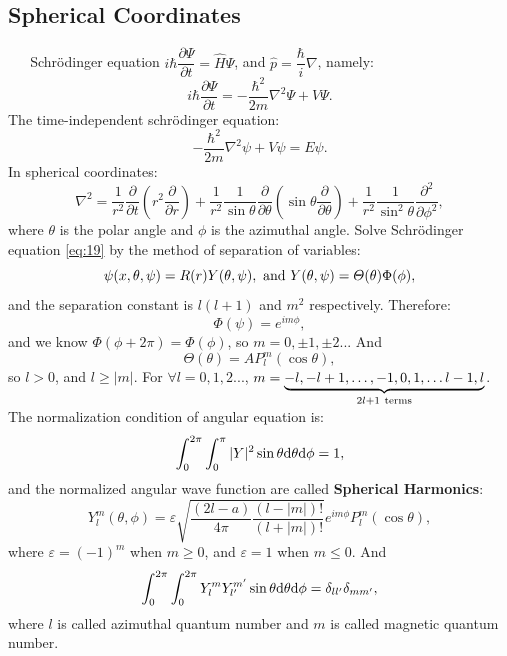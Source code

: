 \documentclass[12pt, 
]{article}
\begin{document}
\subsection{Spherical Coordinates}
$\phantom{aaa}$Schr\"odinger equation $i\hbar\dfrac{\partial \varPsi}{\partial t}=\hat{H}\varPsi$, and $\hat{p}=\dfrac{\hbar}{i}\nabla$, namely:
\begin{equation}\label{eq:18}
	i\hbar\frac{\partial\varPsi}{\partial t}=-\frac{\hbar^2}{2m}\nabla^2\varPsi+V\varPsi.
\end{equation}
The time-independent schr\"odinger equation:
\begin{equation}\label{eq:19}
	-\frac{\hbar^2}{2m}\nabla^2\psi+V\psi=E\psi.
\end{equation}
In spherical coordinates:
\[
	\nabla^2=\frac{1}{r^2}\frac{\partial}{\partial t}\left(r^2\frac{\partial}{\partial r}\right)+\frac{1}{r^2}\frac{1}{\sin\theta}\frac{\partial}{\partial\theta}\left(\sin\theta\frac{\partial}{\partial\theta}\right)+\frac{1}{r^2}\frac{1}{\sin^2\theta}\frac{\partial^2}{\partial \phi^2},
\]
where $\theta$ is the polar angle and $\phi$ is the azimuthal angle. Solve Schrödinger equation \eqref{eq:19} by the method of separation of variables:
\[
	\psi(x,\theta,\psi)=R(r)Y(\theta,\psi),~{\rm and~}Y(\theta,\psi)=\varTheta(\theta)\Phi(\phi),
\]
and the separation constant is $l(l+1)$ and $m^2$ respectively. Therefore:
\[
	\Phi(\psi)=e^{im\phi},
\]
and we know $\Phi(\phi+2\pi)=\Phi(\phi)$, so $m=0,\pm1,\pm2...$
And \[
	\varTheta(\theta)=AP_l^m(\cos\theta),
\]
so $l>0$, and $l\geqslant|m|$. For $\forall l=0,1,2...$, $m=\underbrace{-l,-l+1,\dots,-1,0,1,\dots l-1,l}_{2l+1~{\rm terms}}$.\\
The normalization condition of angular equation is:
\[
	\int_0^{2\pi}\int_0^{\pi}|Y|^2\sin\theta{\rm d}\theta{\rm d}\phi=1,
\]
and the normalized angular wave function are called {\bf Spherical Harmonics}:
\[
	Y_l^m(\theta,\phi)=\varepsilon\sqrt{\frac{(2l-a)}{4\pi}\frac{(l-|m|)!}{(l+|m|)!}}e^{im\phi}P_l^m(\cos\theta),
\]
where $\varepsilon=(-1)^m$ when $m\geqslant0$, and $\varepsilon=1$ when $m\leqslant0$. And
\[
	\int_0^{2\pi}\int_0^{2\pi}Y_l^mY_{l'}^{m'}\sin\theta{\rm d}\theta{\rm d}\phi=\delta_{ll'}\delta_{mm'},
\]
where $l$ is called azimuthal quantum number and $m$ is called magnetic quantum number.
\\
\end{document}
